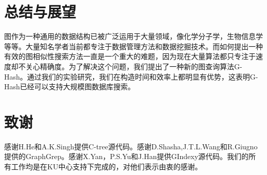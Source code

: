 \documentclass{article}
\begin{document}
\else

\fi
\chapter{总结与展望}
图作为一种通用的数据结构已被广泛运用于大量领域，像化学分子学，生物信息学等等。大量知名学者当前都专注于数据管理方法和数据挖掘技术。而如何提出一种有效的图相似性搜索方法一直是一个重大的难题，因为现在大量算法都只专注于速度却不关心精确度。为了解决这个问题，我们提出了一种新的图查询算法G-Hash。通过我们的实验研究，我们在构造时间和效率上都明显有优势，这表明G-Hash已经可以支持大规模图数据库搜索。
\chapter{致谢}
感谢H.He和A.K.Singh提供C-tree源代码。感谢D.Shasha,J.T.L.Wang和R.Giugno提供的GraphGrep。感谢X.Yan，P.S.Yu和J.Han提供GIndexy源代码。我们的所有工作均是在KU中心支持下完成的，对他们表示由衷的感谢。
\ifx\allfiles\undefined
%
%
\end{document}
